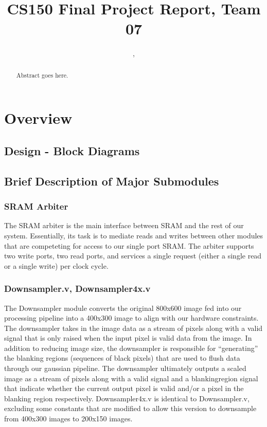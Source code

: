 \documentclass[12pt]{article}
\title{CS150 Final Project Report, Team 07}
\author{\Name, \texttt{\Login}}
\begin{document}
\maketitle

\begin{abstract}

Abstract goes here.

\end{abstract}

\newpage

\section{Overview}


\subsection{Design - Block Diagrams}



\subsection{Brief Description of Major Submodules}

\subsubsection{SRAM Arbiter}

The SRAM arbiter is the main interface between SRAM and the rest of our system.
Essentially, its task is to mediate reads and writes between other modules that
are competeting for access to our single port SRAM. The arbiter supports two 
write ports, two read ports, and services a single request (either a single 
read or a single write) per clock cycle.

\subsubsection{Downsampler.v, Downsampler4x.v}
The Downsampler module converts the original 800x600 image fed into our processing
pipeline into a 400x300 image to align with our hardware constraints. The downsampler
takes in the image data as a stream of pixels along with a valid signal that is
only raised when the input pixel is valid data from the image. In addition to 
reducing image size, the downsampler is responsible for ``generating'' the 
blanking regions (sequences of black pixels) that are used to flush data 
through our gaussian pipeline. The downsampler ultimately outputs a scaled 
image as a stream of pixels along with a valid signal and a blankingregion 
signal that indicate whether the current output pixel is valid and/or a pixel
in the blanking region respectively. Downsampler4x.v is identical to 
Downsampler.v, excluding some constants that are modified to allow this version 
to downsample from 400x300 images to 200x150 images.
\end{document}
